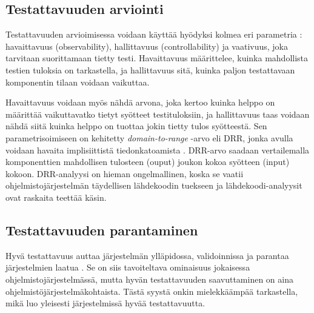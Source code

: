 \documentclass[finnish]{tktltiki2}
\numberwithin{table}{section}
\theoremstyle{definition}
\theoremstyle{remark}
\begin{document}
\subsection{Testattavuuden arviointi} \label{contro_and_observ}

Testattavuuden arvioimisessa voidaan käyttää hyödyksi kolmea eri parametria \citep[s. 2]{baudry_measuring_2003}: havaittavuus (observability), hallittavuus (controllability) ja vaativuus, joka tarvitaan suorittamaan tietty testi. Havaittavuus määrittelee, kuinka mahdollista testien tuloksia on tarkastella, ja hallittavuus sitä, kuinka paljon testattavaan komponentin tilaan voidaan vaikuttaa. 

Havaittavuus voidaan myös nähdä arvona, joka kertoo kuinka helppo on määrittää vaikuttavatko tietyt syötteet testituloksiin, ja hallittavuus taas voidaan nähdä siitä kuinka helppo on tuottaa jokin tietty tulos syötteestä. %
Sen parametrisoimiseen on kehitetty \textit{domain-to-range} -arvo eli DRR, jonka avulla voidaan havaita implisiittistä tiedonkatoamista \citep{Voas:1995:STN:624607.625469}. DRR-arvo saadaan vertailemalla komponenttien mahdollisen tulosteen (ouput) joukon kokoa syötteen (input) kokoon. DRR-analyysi on hieman ongelmallinen, koska se vaatii ohjelmistojärjestelmän täydellisen lähdekoodin tuekseen ja lähdekoodi-analyysit ovat raskaita teettää käsin.




\subsection{Testattavuuden parantaminen}


Hyvä testattavuus auttaa järjestelmän ylläpidossa, validoinnissa ja parantaa järjestelmien laatua \citep[s. 20]{Voas:1995:STN:624607.625469}. Se on siis tavoiteltava ominaisuus jokaisessa ohjelmistojärjestelmässä, mutta hyvän testattavuuden saavuttaminen on aina ohjelmistöjärjestelmäkohtaista. Tästä syystä onkin mielekkäämpää tarkastella, mikä luo yleisesti järjestelmissä hyvää testattavuutta. 

\end{document}
